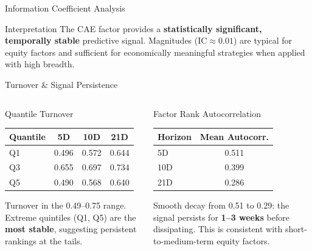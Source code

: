 \documentclass[aspectratio=169, 11pt]{beamer}
\begin{document}
%
%
\begin{frame}{Information Coefficient Analysis}

\begin{alertblock}{Interpretation}
The CAE factor provides a \textbf{statistically significant, temporally stable} predictive signal. Magnitudes ($\text{IC} \approx 0.01$) are typical for equity factors and sufficient for economically meaningful strategies when applied with high breadth.
\end{alertblock}

\end{frame}
%
%
\begin{frame}{Turnover \& Signal Persistence}

\begin{columns}[T]
\begin{block}{Quantile Turnover}
\centering\small
\begin{tabular}{lccc}
\toprule
Quantile & 5D & 10D & 21D \\
\midrule
Q1 & 0.496 & 0.572 & 0.644 \\
Q3 & 0.655 & 0.697 & 0.734 \\
Q5 & 0.490 & 0.568 & 0.640 \\
\bottomrule
\end{tabular}

\medskip
\raggedright
Turnover in the 0.49--0.75 range. Extreme quintiles (Q1, Q5) are the \textbf{most stable}, suggesting persistent rankings at the tails.
\end{block}

\begin{block}{Factor Rank Autocorrelation}
\centering\small
\begin{tabular}{lc}
\toprule
Horizon & Mean Autocorr. \\
\midrule
5D & 0.511 \\
10D & 0.399 \\
21D & 0.286 \\
\bottomrule
\end{tabular}

\medskip
\raggedright
Smooth decay from 0.51 to 0.29: the signal persists for \textbf{1--3 weeks} before dissipating. This is consistent with short-to-medium-term equity factors.
\end{block}
\end{columns}
\end{frame}
\end{document}
